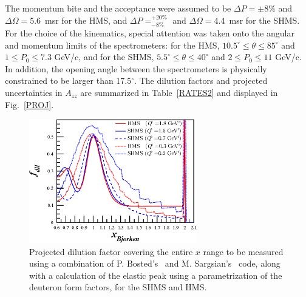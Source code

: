 The momentum bite and the acceptance were assumed to be $\Delta P = \pm 8\%$ and $\Delta\Omega = 5.6$~msr for the HMS, and $\Delta P= ^{+20\%}_{-8\%}$ 
and $\Delta\Omega =4.4$~msr for the SHMS. 
%
For the choice of the kinematics,
special attention was taken onto the angular and momentum limits of the spectrometers: for the
HMS, $10.5^{\circ} \le \theta \le 85^{\circ}$ and $1 \le P_0 \le 7.3$ GeV/c, and for the SHMS,
$5.5^{\circ} \le \theta \le 40^{\circ}$ and $2 \le P_0 \le 11$ GeV/c. In addition, the
opening angle between the spectrometers is physically constrained to be larger than 17.5$^{\circ}$.
The dilution factors and projected uncertainties in $A_{zz}$ are summarized in Table~\ref{RATES2} and displayed in Fig.~\ref{PROJ}.  

\begin{figure}
\begin{center}
\includegraphics[width=0.65\textwidth]{figs/Pzz_30_fdil_all.eps} 
\caption{\label{fdil_plot}Projected dilution factor covering the entire $x$ range to be measured using a combination of P. Bosted's~\cite{Bosted:2012qc} and M. Sargsian's~\cite{misak-convo} code, along with a calculation of the elastic peak using a parametrization of the deuteron form factors, for the SHMS and HMS.}
\end{center}
\end{figure}


